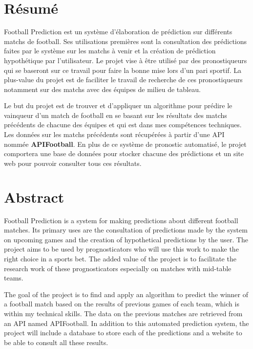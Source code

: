 \documentclass[a4paper,14pt]{extarticle}
\begin{document}
{\setlength{\parindent}{0cm} %
\setlength{\parskip}{1em} %

\newpage
\makeatletter
\begin{versionhistory}
\end{versionhistory}
\makeatother

\section{Résumé}

Football Prediction est un système d'élaboration de prédiction sur différents matchs de football. Ses utilisations premières sont la consultation des prédictions faites par le système sur les matchs à venir et la création de prédiction hypothétique par l'utilisateur. Le projet vise à être utilisé par des pronostiqueurs qui se baseront sur ce travail pour faire la bonne mise lors d'un pari sportif. La plus-value du projet est de faciliter le travail de recherche de ces pronostiqueurs notamment sur des matchs avec des équipes de milieu de tableau.

Le but du projet est de trouver et d'appliquer un algorithme pour prédire le vainqueur d'un match de football en se basant sur les résultats des matchs précédents de chacune des équipes et qui est dans mes compétences techniques. Les données sur les matchs précédents sont récupérées à partir d'une API nommée \textbf{APIFootball}. En plus de ce système de pronostic automatisé, le projet comportera une base de données pour stocker chacune des prédictions et un site web pour pouvoir consulter tous ces résultats.

\newpage

\section{Abstract}

Football Prediction is a system for making predictions about different football matches. Its primary uses are the consultation of predictions made by the system on upcoming games and the creation of hypothetical predictions by the user. The project aims to be used by prognosticators who will use this work to make the right choice in a sports bet. The added value of the project is to facilitate the research work of these prognosticators especially on matches with mid-table teams.

The goal of the project is to find and apply an algorithm to predict the winner of a football match based on the results of previous games of each team, which is within my technical skills. The data on the previous matches are retrieved from an API named APIFootball. In addition to this automated prediction system, the project will include a database to store each of the predictions and a website to be able to consult all these results.

}
\end{document}
